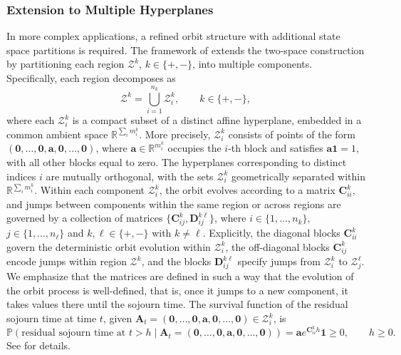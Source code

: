 \documentclass[a4paper,11pt]{article}
\numberwithin{equation}{section}
\theoremstyle{plain}
\theoremstyle{definition}
\newcommand{\1}{\mathbf{1}}
\begin{document}
\subsubsection{Extension to Multiple Hyperplanes}
In more complex applications, a refined orbit structure with additional state space partitions is required. The framework of \cite{BeanNguyenNielsenPeralta2022} extends the two-space construction by partitioning each region $\mathcal{Z}^k$, $k\in \{+,-\}$, into multiple components. Specifically, each region decomposes as
\begin{equation}\label{eq:hyperplane_partition_general}
\mathcal{Z}^k = \bigcup_{i=1}^{n_k} \mathcal{Z}_i^k, \qquad k \in \{+, -\},
\end{equation}
where each $\mathcal{Z}_i^k$ is a compact subset of a distinct affine hyperplane, embedded in a common ambient space $\mathbb{R}^{\sum_i m_i^k}$. More precisely, $\mathcal{Z}_i^k$ consists of points of the form $(\bm{0}, \ldots, \bm{0}, \bm{a}, \bm{0}, \ldots, \bm{0})$, where $\bm{a}\in \mathbb{R}^{m_i^k}$ occupies the $i$-th block and satisfies $\bm{a}\bm{1} = 1$, with all other blocks equal to zero. The hyperplanes corresponding to distinct indices $i$ are mutually orthogonal, with the sets $\mathcal{Z}_i^k$ geometrically separated within $\mathbb{R}^{\sum_i m_i^k}$.
Within each component $\mathcal{Z}_i^k$, the orbit evolves according to a matrix $\bm{C}_{ii}^k$, and jumps between components within the same region or across regions are governed by a collection of matrices $\{\bm{C}_{ij}^k, \bm{D}_{ij}^{k\ell}\}$, where $i\in \{1,\ldots, n_k\}$, $j\in \{1,\ldots, n_\ell\}$ and $k,\ell\in \{+,-\}$ with $k\neq\ell$. 
Explicitly, the diagonal blocks $\bm{C}_{ii}^k$ govern the deterministic orbit evolution within $\mathcal{Z}_i^k$, the off-diagonal blocks $\bm{C}_{ij}^k$ encode jumps within region $\mathcal{Z}^k$, and the blocks $\bm{D}_{ij}^{k\ell}$ specify jumps from $\mathcal{Z}_i^k$ to $\mathcal{Z}_j^\ell$.
We emphasize that the matrices are defined in such a way that the evolution of the orbit process is well-defined, that is, once it jumps to a new component, it takes values there until the sojourn time.
The survival function of the residual sojourn time at time $t$, given $\bm{A}_t = (\bm{0}, \ldots, \bm{0}, \bm{a}, \bm{0}, \ldots, \bm{0}) \in \mathcal{Z}_i^k$, is
\begin{equation}\label{eq:residual_sojourn_component}
\mathbb{P}(\text{residual sojourn time at } t > h \mid \bm{A}_t = (\bm{0}, \ldots, \bm{0}, \bm{a}, \bm{0}, \ldots, \bm{0})) = \bm{a} e^{\bm{C}_{ii}^k h} \bm{1} \ge 0, \qquad h \ge 0.
\end{equation}
See \cite[Section 3.1]{BeanNguyenNielsenPeralta2022} for details.
\end{document}
